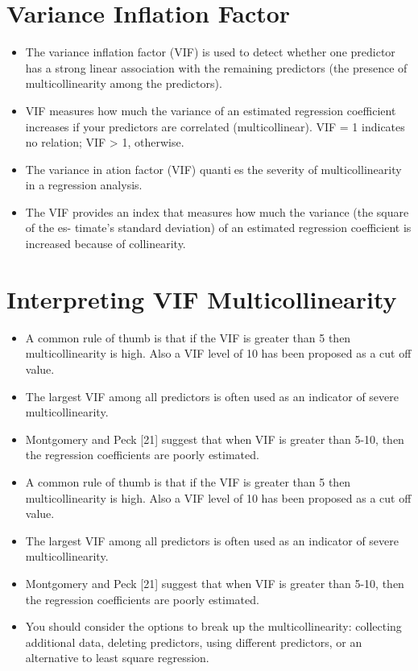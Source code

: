 \documentclass[a4paper,12pt]{article}
\begin{document}
\section*{Variance Inflation Factor}
\begin{itemize}
\item The variance inflation factor (VIF) is used to detect whether one predictor has a strong linear
association with the remaining predictors (the presence of multicollinearity among the
predictors). 
\item VIF measures how much the variance of an estimated regression coefficient
increases if your predictors are correlated (multicollinear).
VIF = 1 indicates no relation; VIF > 1, otherwise.
\item The variance in
ation factor (VIF) quanties the severity of multicollinearity in a regression
analysis.
\item The VIF provides an index that measures how much the variance (the square of the es-
timate's standard deviation) of an estimated regression coefficient is increased because of
collinearity.

\end{itemize}



\section{Interpreting VIF Multicollinearity}

\begin{itemize}
\item  A common rule of thumb is that if the VIF is greater than 5 then multicollinearity is high. Also a VIF
level of 10 has been proposed as a cut off value.
\item  The largest VIF among all predictors is often used as an indicator of severe multicollinearity.
\item  Montgomery and Peck [21] suggest that when VIF is greater than 5-10, then the regression coefficients are poorly estimated.
\item A common rule of thumb is that if the VIF is greater than 5 then multicollinearity is high.
Also a VIF level of 10 has been proposed as a cut off value.
\item The largest VIF among all predictors is often used as an indicator of severe multicollinearity. 
\item Montgomery and Peck [21] suggest that when VIF is greater than 5-10, then the regression coefficients are poorly estimated. \item You should
consider the options to break up the multicollinearity: collecting additional data, deleting
predictors, using different predictors, or an alternative to least square regression.
\end{itemize}
\end{document}
